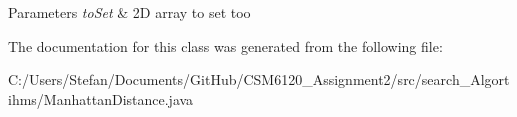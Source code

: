 \begin{DoxyParams}{Parameters}
{\em to\+Set} & 2\+D array to set too \\
\hline
\end{DoxyParams}


The documentation for this class was generated from the following file\+:\begin{DoxyCompactItemize}
\item 
C\+:/\+Users/\+Stefan/\+Documents/\+Git\+Hub/\+C\+S\+M6120\+\_\+\+Assignment2/src/search\+\_\+\+Algortihms/Manhattan\+Distance.\+java\end{DoxyCompactItemize}
